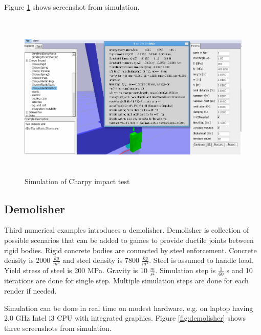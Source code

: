 Figure \ref{fig:charpy} shows screenshot from simulation.
\begin{figure}[htb!]
\centering
\includegraphics[height=8cm]{figs/article-charpy}
\caption{Simulation of Charpy impact test}
\label{fig:charpy}
\end{figure}


\subsection{Demolisher}
Third numerical examples introduces a demolisher.
Demolisher is collection of possible scenarios that can be added to games to provide ductile joints between
rigid bodies.  Rigid concrete bodies are connected by steel enforcement.
Concrete density is 2000 $\frac{kg}{m^3}$ and steel density is 7800 $\frac{kg}{m^3}$. 
Steel is assumed to handle load. Yield stress of steel is 200 MPa.
Gravity is 10  $\frac{m}{s^2}$. Simulation step is $\frac{1}{60} $ s and 10 
iterations are done for single step. Multiple simulation steps are done for each render if needed.

Simulation can be done in real time on modest hardware, e.g. 
on laptop having 2.0 GHz Intel i3 CPU with integrated graphics. 
Figure \ref{fig:demolisher} shows three screenshots from simulation.

